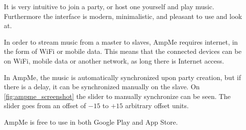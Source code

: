 It is very intuitive to join a party, or host one yourself and play music.
Furthermore the interface is modern, minimalistic, and pleasant to use and look at.

In order to stream music from a master to slaves, AmpMe requires internet, in the form of WiFi or mobile data.
This means that the connected devices can be on WiFi, mobile data or another network, as long there is Internet access.

In AmpMe, the music is automatically synchronized upon party creation,
but if there is a delay, it can be synchronized manually on the slave.
On \cref{fig:ampme_screenshot} the slider to manually synchronize can be seen.
The slider goes from an offset of $-15$ to $+15$ arbitrary offset units.

AmpMe is free to use in both Google Play and App Store.\cite{amp_faq}\cite{amp_play}\cite{amp_itunes}

